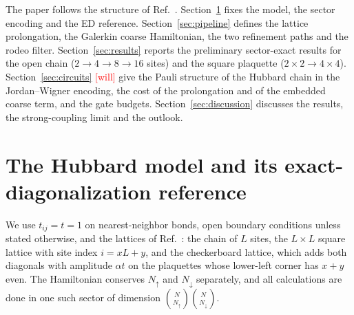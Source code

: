 \documentclass[
  aps,
  prc,
  reprint,
  superscriptaddress,
  floatfix,
  nofootinbib
]{revtex4-2}
\newcommand{\todo}[1]{\textcolor{red}{[#1]}}
\begin{document}
The paper follows the structure of Ref.~\cite{EigenQPairing2026}.
Section~\ref{sec:model} fixes the model, the sector encoding and the ED
reference.  Section~\ref{sec:pipeline} defines the lattice prolongation, the
Galerkin coarse Hamiltonian, the two refinement paths and the rodeo filter.
Section~\ref{sec:results} reports the preliminary sector-exact results for
the open chain ($2\to4\to8\to16$ sites) and the square plaquette
($2\times2\to4\times4$).  Section~\ref{sec:circuits} \todo{will} give the
Pauli structure of the Hubbard chain in the Jordan--Wigner encoding, the
cost of the prolongation and of the embedded coarse term, and the gate
budgets.  Section~\ref{sec:discussion} discusses the results, the
strong-coupling limit and the outlook.

\section{The Hubbard model and its exact-diagonalization reference}
\label{sec:model}
We use $t_{ij}=t=1$ on nearest-neighbor bonds, open boundary conditions
unless stated otherwise, and the lattices of Ref.~\cite{HubbardNotebook}:
the chain of $L$ sites, the $L\times L$ square lattice with site index
$i=xL+y$, and the checkerboard lattice, which adds both diagonals with
amplitude $\alpha t$ on the plaquettes whose lower-left corner has $x+y$
even.  The Hamiltonian conserves $N_\uparrow$ and $N_\downarrow$ separately,
and all calculations are done in one such sector of dimension
$\binom{N}{N_\uparrow}\binom{N}{N_\downarrow}$.
\end{document}
